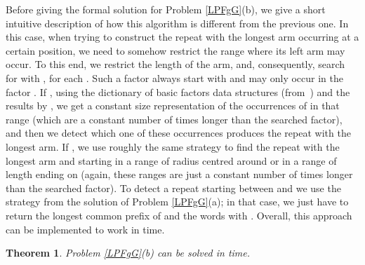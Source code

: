 \documentclass[final]{dmtcs-episciences}
\newtheorem{theorem}{Theorem}
\begin{document}
Before giving the formal solution for Problem \ref{LPFgG}(b), we give a short intuitive description of how this algorithm is different from the previous one. In this case, when trying to construct the repeat  with the longest arm occurring at a certain position, we need to somehow restrict the range where its left arm may occur. To this end, we restrict the length of the arm, and, consequently, search for  with , for each . Such a factor always start with  and may only occur in the factor . If , using the dictionary of basic factors data structures (from~\cite{DBF}) and the results by \cite{KociumakaSPIRE2012}, we get a constant size representation of the occurrences of  in that range (which are a constant number of times longer than the searched factor), and then we detect which one of these occurrences produces the repeat  with the longest arm. If , we use roughly the same strategy to find the repeat  with the longest arm and  starting in a range of radius  centred around  or in a range of length  ending on  (again, these ranges are just a constant number of times longer than the searched factor). To detect a repeat starting between  and  we use the strategy from the solution of Problem \ref{LPFgG}(a); in that case, we just have to return the longest common prefix of  and the words  with . Overall, this approach can be implemented to work in  time.
\begin{theorem}\label{sol_LPFgG}
Problem \ref{LPFgG}(b) can be solved in  time.
\end{theorem}
\end{document}
